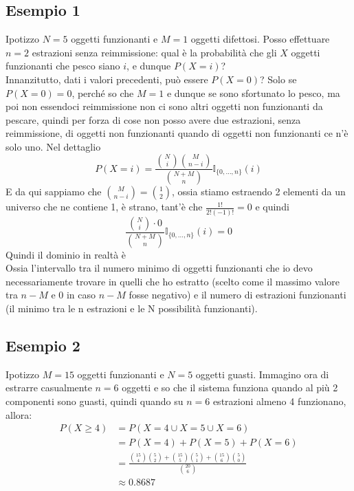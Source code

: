 \documentclass[11pt]{report}
\begin{document}
\subsection{Esempio 1}
Ipotizzo $N=5$ oggetti funzionanti e $M=1$ oggetti difettosi. Posso effettuare $n=2$ estrazioni senza reimmissione: qual è la probabilità che gli $X$ oggetti funzionanti che pesco siano $i$, e dunque $P(X=i)$?\\
Innanzitutto, dati i valori precedenti, può essere $P(X=0)$? Solo se $P(X=0)=0$, perché so che $M=1$ e dunque se sono sfortunato lo pesco, ma poi non essendoci reimmissione non ci sono altri oggetti non funzionanti da pescare, quindi per forza di cose non posso avere due estrazioni, senza reimmissione, di oggetti non funzionanti quando di oggetti non funzionanti ce n'è solo uno. Nel dettaglio
\begin{equation}
    P(X=i) = \frac{\binom{N}{i}\binom{M}{n-i}}{\binom{N+M}{n}} \mathbb{I}_{\{0, \dots ,n\}}(i)
\end{equation}
E da qui sappiamo che $\binom{M}{n-i} = \binom{1}{2}$, ossia stiamo estraendo 2 elementi da un universo che ne contiene 1, è strano, tant'è che $\frac{1!}{2!(-1)!} = 0$ e quindi
\begin{equation}
    \frac{\binom{N}{i} \cdot 0}{\binom{N+M}{n}} \mathbb{I}_{\{0, \dots ,n\}}(i) = 0
\end{equation}
Quindi il dominio in realtà è
\begin{equation}
    [max \{ 0, n-M \}, min \{ n, N \}]
\end{equation}
Ossia l'intervallo tra il numero minimo di oggetti funzionanti che io devo necessariamente trovare in quelli che ho estratto (scelto come il massimo valore tra $n-M$ e 0 in caso $n-M$ fosse negativo) e il numero di estrazioni funzionanti (il minimo tra le n estrazioni e le N possibilità funzionanti).
\subsection{Esempio 2}
Ipotizzo $M=15$ oggetti funzionanti e $N=5$ oggetti guasti. Immagino ora di estrarre casualmente $n=6$ oggetti e so che il sistema funziona quando al più 2 componenti sono guasti, quindi quando su $n=6$ estrazioni almeno 4 funzionano, allora:
\begin{equation}
    \begin{split}
       P(X \geq 4) & = P(X=4 \cup X=5 \cup X=6)\\
       & = P(X=4) + P(X=5) + P(X=6)\\
       & = \frac{\binom{15}{4}\binom{5}{2} + \binom{15}{5}\binom{5}{1} + \binom{15}{6}\binom{5}{0}}{\binom{20}{6}}\\
       & \approx 0.8687
    \end{split}
\end{equation}
\end{document}

